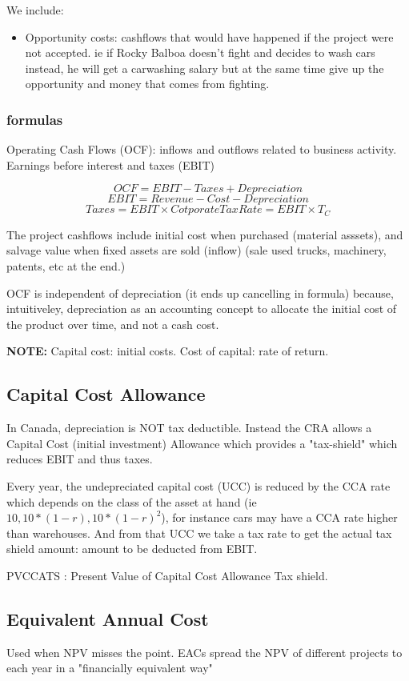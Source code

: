 \documentclass{article}
\begin{document}
We include: 
\begin{itemize}
\item Opportunity costs: cashflows that would have happened if the project were not accepted. ie if Rocky Balboa doesn't fight and decides to wash cars instead, he will get a carwashing salary but at the same time give up the opportunity and money that comes from fighting. 
\end{itemize}

\subsubsection{formulas}
Operating Cash Flows (OCF): inflows and outflows related to business activity. 
Earnings before interest and taxes (EBIT)

\[ OCF = EBIT - Taxes + Depreciation \]
\[ EBIT =  Revenue - Cost - Depreciation \]
\[ Taxes = EBIT \times Cotporate Tax Rate = EBIT 
\times T_C \]

The project cashflows include initial cost when purchased (material asssets), and salvage value when fixed assets are sold (inflow) (sale used trucks, machinery, patents, etc at the end.)

OCF is independent of depreciation (it ends up cancelling in formula) because, intuitiveley, depreciation as an accounting concept to allocate the initial cost of the product over time, and not a cash cost. 

\textbf{NOTE:} Capital cost: initial costs. Cost of capital: rate of return. 

\subsection{Capital Cost Allowance}
In Canada, depreciation is NOT tax deductible. Instead the CRA allows a Capital Cost (initial investment) Allowance which provides a "tax-shield" which reduces EBIT and thus taxes.  

Every year, the undepreciated capital cost (UCC) is reduced by the CCA rate which depends on the class of the asset at hand (ie $10, 10*(1-r), 10*(1-r)^2$), for instance cars may have a CCA rate higher than warehouses. 
And from that UCC we take a tax rate to get the actual tax shield amount: amount to be deducted from EBIT.  

PVCCATS : Present Value of Capital Cost Allowance Tax shield.

\subsection{Equivalent Annual Cost}
Used when NPV misses the point. EACs spread the NPV of different projects to each year in a "financially equivalent way"
\end{document}
